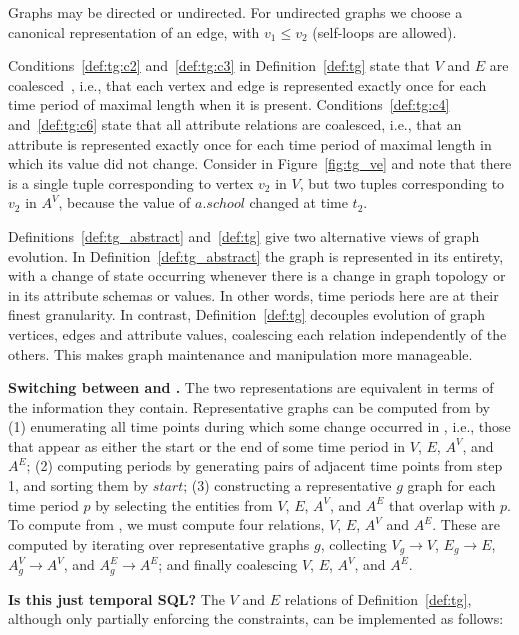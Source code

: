 Graphs may be directed or undirected.  For undirected graphs we choose
a canonical representation of an edge, with $v_1 \leq v_2$ (self-loops
are allowed).

Conditions~\ref{def:tg:c2} and~\ref{def:tg:c3} in
Definition~\ref{def:tg} state that $V$ and $E$ are
coalesced~\cite{DBLP:conf/vldb/BohlenSS96}, i.e., that each vertex and
edge is represented exactly once for each time period of maximal
length when it is present.  Conditions~\ref{def:tg:c4}
and~\ref{def:tg:c6} state that all attribute relations are coalesced,
i.e., that an attribute is represented exactly once for each time
period of maximal length in which its value did not change.  Consider
 in Figure~\ref{fig:tg_ve} and note that there is a single
tuple corresponding to vertex $v_2$ in $V$, but two tuples
corresponding to $v_2$ in $A^{V}$, because the value of $a.school$
changed at time $t_2$.

Definitions~\ref{def:tg_abstract} and~\ref{def:tg} give two
alternative views of graph evolution.  In
Definition~\ref{def:tg_abstract} the graph is represented in its
entirety, with a change of state occurring whenever there is a change
in graph topology or in its attribute schemas or values.  In other
words, time periods here are at their finest granularity.  In
contrast, Definition~\ref{def:tg} decouples evolution of graph
vertices, edges and attribute values, coalescing each relation
independently of the others.  This makes graph maintenance and
manipulation more manageable.

{\bf Switching between \rgs and \ve.}  The two \tg representations are
equivalent in terms of the information they contain.
\textsf{Representative graphs} can be computed from \ve by (1)
enumerating all time points during which some change occurred in \ve,
i.e., those that appear as either the start or the end of some time
period in $V$, $E$, $A^{V}$, and $A^{E}$; (2) computing \rgs periods
by generating pairs of adjacent time points from step 1, and sorting
them by $start$; (3) constructing a representative $g$ graph for each
time period $p$ by selecting the entities from $V$, $E$, $A^{V}$, and
$A^{E}$ that overlap with $p$.  To compute \ve from \rgs, we must
compute four relations, $V$, $E$, $A^{V}$ and $A^{E}$.  These are
computed by iterating over representative graphs $g$, collecting $V_g
\rightarrow V$, $E_g \rightarrow E$, $A^{V}_g \rightarrow A^{V}$, and
$A^{E}_g \rightarrow A^{E}$; and finally coalescing $V$, $E$, $A^{V}$,
and $A^{E}$.

{\bf Is this just temporal SQL?} The $V$ and $E$ relations of
Definition~\ref{def:tg}, although only partially enforcing the
constraints, can be implemented as follows:

